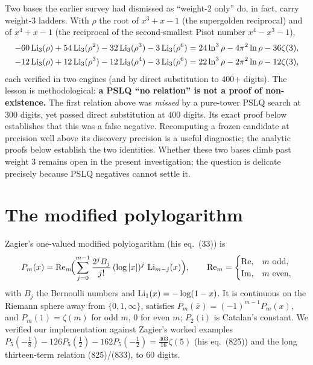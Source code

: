 Two bases the earlier survey had dismissed as ``weight-$2$ only'' do, in fact, carry weight-$3$ ladders. With
$\rho$ the root of $x^3+x-1$ (the supergolden reciprocal) and of $x^4+x-1$ (the reciprocal of the second-smallest
Pisot number $x^4-x^3-1$),
{\footnotesize
\begin{align*}
  -60\operatorname{Li}_3(\rho)+54\operatorname{Li}_3(\rho^2)-32\operatorname{Li}_3(\rho^3)-3\operatorname{Li}_3(\rho^6)&=24\ln^3\rho-4\pi^2\ln\rho-36\zeta(3),\\
  -12\operatorname{Li}_3(\rho)+12\operatorname{Li}_3(\rho^3)-12\operatorname{Li}_3(\rho^4)-3\operatorname{Li}_3(\rho^6)&=22\ln^3\rho-2\pi^2\ln\rho-12\zeta(3),
\end{align*}}
\!each verified in two engines (and by direct substitution to $400$+ digits). The lesson is methodological:
\textbf{a PSLQ ``no relation'' is not a proof of non-existence.} The first relation above was \emph{missed} by a
pure-tower PSLQ search at $300$ digits, yet passed direct substitution
at $400$ digits. Its exact proof below establishes that this was a false
negative. Recomputing a frozen candidate at precision well above its
discovery precision is a useful diagnostic; the analytic proofs below
establish the two identities. Whether these two bases climb past weight
$3$ remains open in the present investigation; the question is delicate
precisely because PSLQ negatives cannot settle it.



\section{The modified polylogarithm}
Zagier's one-valued modified polylogarithm (his eq.~(33)) is
\begin{equation}\label{bloch:eq:Pm}
  P_m(x)=\operatorname{Re}_m\!\Bigl(\sum_{j=0}^{m-1} \frac{2^j B_j}{j!}\,(\log|x|)^j\,\operatorname{Li}_{m-j}(x)\Bigr),\qquad
  \operatorname{Re}_m=\begin{cases}\operatorname{Re},&m\text{ odd},\\ \operatorname{Im},&m\text{ even},\end{cases}
\end{equation}
with $B_j$ the Bernoulli numbers and $\operatorname{Li}_1(x)=-\log(1-x)$. It is continuous on the Riemann sphere away from
$\{0,1,\infty\}$, satisfies $P_m(\bar x)=(-1)^{m-1}P_m(x)$, and $P_m(1)=\zeta(m)$ for odd $m$, $0$ for even $m$;
$P_2(\mathrm i)$ is Catalan's constant. We verified our implementation against Zagier's worked examples
$P_5(-\tfrac18)-126P_5(\tfrac12)-162P_5(-\tfrac12)=\tfrac{403}{16}\zeta(5)$ (his eq.~(825)) and the long
thirteen-term relation (825)/(833), to $60$ digits.

